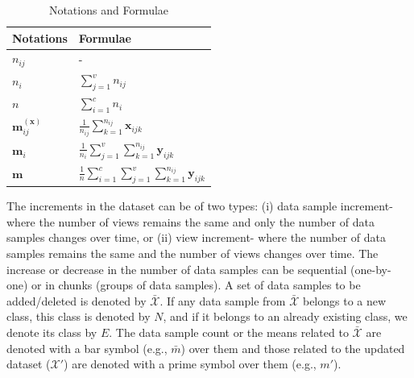 \begin{table}[t]
	\centering
	\caption{Notations and Formulae}
	\label{tab:Equations}
		\begin{tabular}{l l} \toprule
		Notations & Formulae \\
		\midrule
		$n_{ij}$ & - \\[0.2cm] 
		$n_{i}$ & $\sum\limits_{j=1}^{v} n_{ij}$ \\[0.2cm] 
		$n$ & $\sum\limits_{i=1}^{c} n_i$ \\[0.2cm] 
		$\textbf{m}_{ij}^{(\textbf{x})}$ & $ \frac{1}{n_{ij}} \sum\limits_{k=1}^{n_{ij}} \textbf{x}_{ijk}$ \\[0.2cm] 
		$\textbf{m}_i$ & $\frac{1}{n_i} \sum\limits_{j=1}^{v} \sum\limits_{k=1}^{n_{ij}} \textbf{y}_{ijk}$ \\[0.2cm] 
		$\textbf{m}$ & $\frac{1}{n} \sum\limits_{i=1}^{c} \sum\limits_{j=1}^{v} \sum\limits_{k=1}^{n_{ij}} \textbf{y}_{ijk}$ \\
		
		\bottomrule
	\end{tabular}
\end{table}


The increments in the dataset can be of two types: (i) data sample increment- where the number of views remains the same and only the number of data samples changes over time, or (ii) view increment- where the number of data samples remains the same and the number of views changes over time. The increase or decrease in the number of data samples can be sequential (one-by-one) or in chunks (groups of data samples). A set of data samples to be added/deleted is denoted by $\bar{\mathcal{X}}$. If any data sample from $\bar{\mathcal{X}}$ belongs to a new class, this class is denoted by $N$, and if it belongs to an already existing class, we denote its class by $E$. The data sample count or the means related to $\bar{\mathcal{X}}$ are denoted with a bar symbol (e.g., $\bar{m}$) over them and those related to the updated dataset ($\mathcal{X}'$) are denoted with a prime symbol over them (e.g., $m'$).














